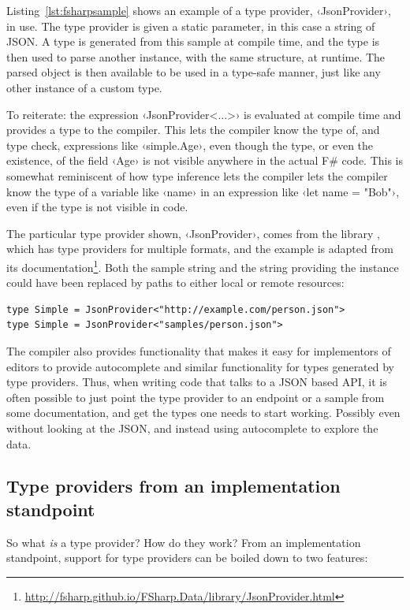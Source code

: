 Listing~\ref{lst:fsharpsample} shows an example of a type provider, ‹JsonProvider›, in use. The type provider is given a static parameter, in this case a string of JSON. A type is generated from this sample at compile time, and the type is then used to parse another instance, with the same structure, at runtime. The parsed object is then available to be used in a type-safe manner, just like any other instance of a custom type.

To reiterate: the expression ‹JsonProvider<...>› is evaluated at compile time and provides a type to the compiler. This lets the compiler know the type of, and type check, expressions like ‹simple.Age›, even though the type, or even the existence, of the field ‹Age› is not visible anywhere in the actual F\# code. This is somewhat reminiscent of how type inference lets the compiler lets the compiler know the type of a variable like ‹name› in an expression like ‹let name = "Bob"›, even if the type is not visible in code.

The particular type provider shown, ‹JsonProvider›, comes from the library \fsharpdata\cite{fsharpdata}, which has type providers for multiple formats, and the example is adapted from its documentation\footnote{\url{http://fsharp.github.io/FSharp.Data/library/JsonProvider.html}}. Both the sample string and the string providing the instance could have been replaced by paths to either local or remote resources:

\begin{verbatim}
type Simple = JsonProvider<"http://example.com/person.json">
type Simple = JsonProvider<"samples/person.json">
\end{verbatim}

The compiler also provides functionality that makes it easy for implementors of editors to provide autocomplete and similar functionality for types generated by type providers. Thus, when writing code that talks to a JSON based API, it is often possible to just point the type provider to an endpoint or a sample from some documentation, and get the types one needs to start working. Possibly even without looking at the JSON, and instead using autocomplete to explore the data.

\subsection{Type providers from an implementation standpoint}

So what \emph{is} a type provider? How do they work? From an implementation standpoint, support for type providers can be boiled down to two features:

